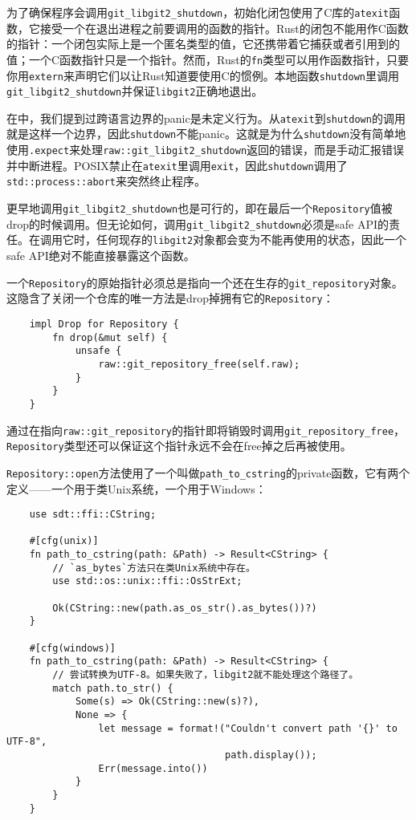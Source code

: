 为了确保程序会调用\texttt{git\_libgit2\_shutdown}，初始化闭包使用了C库的\texttt{atexit}函数，它接受一个在退出进程之前要调用的函数的指针。Rust的闭包不能用作C函数的指针：一个闭包实际上是一个匿名类型的值，它还携带着它捕获或者引用到的值；一个C函数指针只是一个指针。然而，Rust的\texttt{fn}类型可以用作函数指针，只要你用\texttt{extern}来声明它们以让Rust知道要使用C的惯例。本地函数\texttt{shutdown}里调用\texttt{git\_libgit2\_shutdown}并保证\texttt{libgit2}正确地退出。

在中，我们提到过跨语言边界的panic是未定义行为。从\texttt{atexit}到\texttt{shutdown}的调用就是这样一个边界，因此\texttt{shutdown}不能panic。这就是为什么\texttt{shutdown}没有简单地使用\texttt{.expect}来处理\texttt{raw::git\_libgit2\_shutdown}返回的错误，而是手动汇报错误并中断进程。POSIX禁止在\texttt{atexit}里调用\texttt{exit}，因此\texttt{shutdown}调用了\texttt{std::process::abort}来突然终止程序。

更早地调用\texttt{git\_libgit2\_shutdown}也是可行的，即在最后一个\texttt{Repository}值被drop的时候调用。但无论如何，调用\texttt{git\_libgit2\_shutdown}必须是safe API的责任。在调用它时，任何现存的\texttt{libgit2}对象都会变为不能再使用的状态，因此一个safe API绝对不能直接暴露这个函数。

一个\texttt{Repository}的原始指针必须总是指向一个还在生存的\texttt{git\_repository}对象。这隐含了关闭一个仓库的唯一方法是drop掉拥有它的\texttt{Repository}：
\begin{verbatim}
    impl Drop for Repository {
        fn drop(&mut self) {
            unsafe {
                raw::git_repository_free(self.raw);
            }
        }
    }
\end{verbatim}

通过在指向\texttt{raw::git\_repository}的指针即将销毁时调用\texttt{git\_repository\_free}，\\
\texttt{Repository}类型还可以保证这个指针永远不会在free掉之后再被使用。

\texttt{Repository::open}方法使用了一个叫做\texttt{path\_to\_cstring}的private函数，它有两个定义——一个用于类Unix系统，一个用于Windows：
\begin{verbatim}
    use sdt::ffi::CString;

    #[cfg(unix)]
    fn path_to_cstring(path: &Path) -> Result<CString> {
        // `as_bytes`方法只在类Unix系统中存在。
        use std::os::unix::ffi::OsStrExt;

        Ok(CString::new(path.as_os_str().as_bytes())?)
    }

    #[cfg(windows)]
    fn path_to_cstring(path: &Path) -> Result<CString> {
        // 尝试转换为UTF-8。如果失败了，libgit2就不能处理这个路径了。
        match path.to_str() {
            Some(s) => Ok(CString::new(s)?),
            None => {
                let message = format!("Couldn't convert path '{}' to UTF-8",
                                      path.display());
                Err(message.into())
            }
        }
    }
\end{verbatim}

